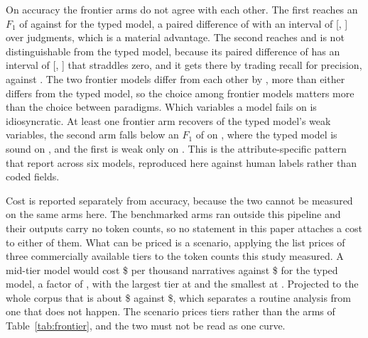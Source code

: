 On accuracy the frontier arms do not agree with each other. The first reaches an $F_1$ of
\FableFone{} against \GoldFone{} for the typed model, a paired difference of \DiffJevFable{}
with an interval of [\DiffJevFableLo{}, \DiffJevFableHi{}] over \PairedN{} judgments, which is a
material advantage. The second reaches \GPTFone{} and is not distinguishable from the typed
model, because its paired difference of \DiffJevGPT{} has an interval of
[\DiffJevGPTLo{}, \DiffJevGPTHi{}] that straddles zero, and it gets there by trading recall for
precision, \GPTRecall{} against \GPTPrecision{}. The two frontier models differ from each other
by \DiffFableGPT{}, more than either differs from the typed model, so the choice among frontier
models matters more than the choice between paradigms. Which variables a model fails on is
idiosyncratic. At least one frontier arm recovers \FrontierNRecovered{} of the typed model's
\GoldNWeak{} weak variables, the second arm falls below an $F_1$ of \FrontierWeakThreshold{} on
\GPTWeakVars{}, where the typed model is sound on \GPTNWeakJevSound{}, and the first is weak
only on \FableWeakVars{}. This is the attribute-specific pattern that
\citet{bharati2026benchmarking} report across six models, reproduced here against human labels
rather than coded fields.

Cost is reported separately from accuracy, because the two cannot be measured on the same arms
here. The benchmarked arms ran outside this pipeline and their outputs carry no token counts, so
no statement in this paper attaches a cost to either of them. What can be priced is a scenario,
applying the list prices of three commercially available tiers to the token counts this study
measured. A mid-tier model would cost \$\FrontierCostSonnet{} per thousand narratives against
\$\CostPerThousand{} for the typed model, a factor of \FrontierCostRatio{}, with the largest
tier at \FrontierCostRatioOpus{} and the smallest at \FrontierCostRatioHaiku{}. Projected to the
whole corpus that is about \$\CostWholeCorpusSonnet{} against \$\CostWholeCorpus{}, which
separates a routine analysis from one that does not happen. The scenario prices tiers rather
than the arms of Table~\ref{tab:frontier}, and the two must not be read as one curve.



